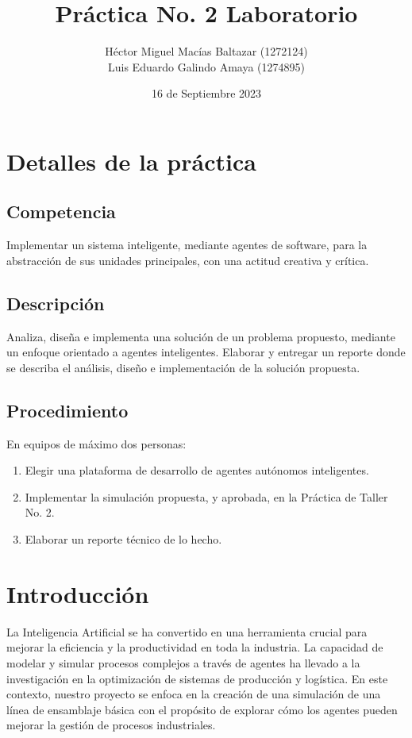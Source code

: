 \documentclass[11pt]{article}
\author{Héctor Miguel Macías Baltazar  (1272124) \\
Luis Eduardo Galindo Amaya  (1274895)}
\date{16 de Septiembre 2023}
\title{Práctica No. 2 Laboratorio}
\begin{document}
\thispagestyle{empty}\tableofcontents\pagebreak
{} 

\section{Detalles de la práctica}
\label{sec:org12a807d}
\subsection{Competencia}
\label{sec:org2bcc8c5}
Implementar un sistema inteligente, mediante agentes de software, para la abstracción de sus unidades principales, con una actitud creativa y crítica.

\subsection{Descripción}
\label{sec:org0fcbbd4}
Analiza, diseña e implementa una solución de un problema propuesto, mediante un enfoque orientado a agentes inteligentes. Elaborar y entregar un reporte donde se describa el análisis, diseño e implementación de la solución propuesta.

\subsection{Procedimiento}
\label{sec:orgd7a65df}
En equipos de máximo dos personas:
\begin{enumerate}
\item Elegir una plataforma de desarrollo de agentes autónomos inteligentes.
\item Implementar la simulación propuesta, y aprobada, en la Práctica de Taller No. 2.
\item Elaborar un reporte técnico de lo hecho.
\end{enumerate}

\section{Introducción}
\label{sec:org8bbf995}
La Inteligencia Artificial se ha convertido en una herramienta crucial para mejorar la eficiencia y la productividad en toda la industria. La capacidad de modelar y simular procesos complejos a través de agentes ha llevado a la investigación en la optimización de sistemas de producción y logística. En este contexto, nuestro proyecto se enfoca en la creación de una simulación de una línea de ensamblaje básica con el propósito de explorar cómo los agentes pueden mejorar la gestión de procesos industriales.
\end{document}
